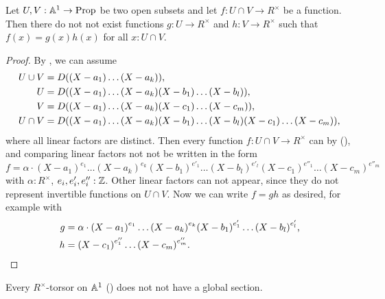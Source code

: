 \begin{lemma}%
  \label{decompose-invertible-function-on-intersection-in-A1}
  Let $U, V : \mathbb{A}^1 \to \mathrm{Prop}$ be two open subsets
  and let $f : U \cap V \to R^\times$ be a function.
  Then there do not not exist functions
  $g : U \to R^\times$ and
  $h : V \to R^\times$
  such that $f(x) = g(x)h(x)$ for all $x : U \cap V$.
\end{lemma}

\begin{proof}
  By ,
  we can assume
  \begin{align*}
    U \cup V &= D((X - a_1) \dots (X - a_k)) \rlap{,}\\
    U &= D((X - a_1) \dots (X - a_k) (X - b_1) \dots (X - b_l)) \rlap{,}\\
    V &= D((X - a_1) \dots (X - a_k) (X - c_1) \dots (X - c_m)) \rlap{,}\\
    U \cap V &= D((X - a_1) \dots (X - a_k) (X - b_1) \dots (X - b_l) (X - c_1) \dots (X - c_m))
    \rlap{,}
  \end{align*}
  where all linear factors are distinct.
  Then every function $f : U \cap V \to R^\times$ can
  by (), 
  and comparing linear factors
  not not be written in the form
  \[ f = \alpha \cdot
     {(X - a_1)}^{e_1} \dots {(X - a_k)}^{e_k}
     {(X - b_1)}^{e'_1} \dots {(X - b_l)}^{e'_l}
     {(X - c_1)}^{e''_1} \dots {(X - c_m)}^{e''_m}
  \]
  with $\alpha : R^\times$, $e_i, e'_i, e''_i : \mathbb{Z}$.
  Other linear factors can not appear,
  since they do not represent invertible functions on $U \cap V$.
  Now we can write $f = gh$ as desired,
  for example with
  \begin{align*}
    g &= \alpha \cdot
    {(X - a_1)}^{e_1} \dots {(X - a_k)}^{e_k}
    {(X - b_1)}^{e'_1} \dots {(X - b_l)}^{e'_l} \rlap{,}\\
    h &=
    {(X - c_1)}^{e''_1} \dots {(X - c_m)}^{e''_m} \rlap{.}
  \end{align*}
\end{proof}

\begin{theorem}%
  \label{Gm-torsors-on-A1}
  Every $R^\times$-torsor on $\mathbb{A}^1$ ()
  does not not have a global section.
\end{theorem}

